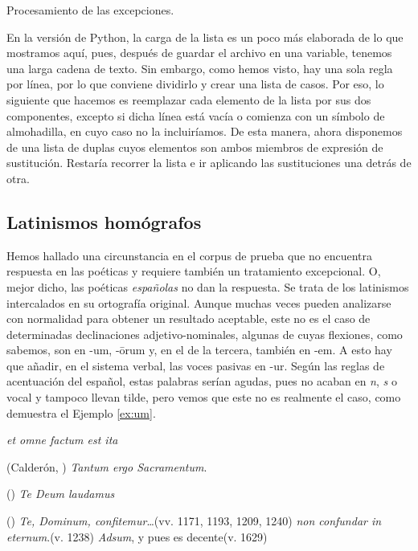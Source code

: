 \begin{algorithm}[!ht] %
	\caption{Procesamiento de las excepciones.}\label{list:silabeador2}
\end{algorithm}

En la versión de Python, la carga de la lista es un poco más elaborada de lo que mostramos aquí, pues, después de guardar el archivo en una variable, tenemos una larga cadena de texto. Sin embargo, como hemos visto, hay una sola regla por línea, por lo que conviene dividirlo y crear una lista de casos. Por eso, lo siguiente que hacemos es reemplazar cada elemento de la lista por sus dos componentes, excepto si dicha línea está vacía o comienza con un símbolo de almohadilla, en cuyo caso no la incluiríamos. De esta manera, ahora disponemos de una lista de duplas cuyos elementos son ambos miembros de expresión de sustitución. Restaría recorrer la lista e ir aplicando las sustituciones una detrás de otra.

\subsection{Latinismos homógrafos}
Hemos hallado una circunstancia en el corpus de prueba que no encuentra respuesta en las poéticas y requiere también un tratamiento excepcional. O, mejor dicho, las poéticas \textit{españolas} no dan la respuesta. Se trata de los latinismos intercalados en su ortografía original. Aunque muchas veces pueden analizarse con normalidad para obtener un resultado aceptable, este no es el caso de determinadas declinaciones adjetivo-nominales, algunas de cuyas flexiones, como sabemos, son en -um, -ōrum y, en el de la tercera, también en -em. A esto hay que añadir, en el sistema verbal, las voces pasivas en -ur. Según las reglas de acentuación del español, estas palabras serían agudas, pues no acaban en \textit{n}, \textit{s} o vocal y tampoco llevan tilde, pero vemos que este no es realmente el caso, como demuestra el Ejemplo \ref{ex:um}.
\begin{exe}
	\ex\label{ex:um}\begin{xlist}
		\ex\label{ex:divino1}\textit{et omne factum est ita}\strut\hfill(Calderón, )
		\ex\label{ex:vacante1}\textit{Tantum ergo Sacramentum}.\strut\hfill()
		\ex\label{ex:pernaso}\textit{Te Deum laudamus}\strut\hfill()
		\ex\label{ex:pernaso2}\textit{Te, Dominum, confitemur}…\hfill(vv. 1171, 1193, 1209, 1240)
		\ex\label{ex:divino3}\textit{non confundar in eternum}.\hfill(v. 1238)
		\ex\label{ex:pernaso4}\textit{Adsum}, y pues es decente\hfill(v. 1629)
	\end{xlist}
\end{exe}

